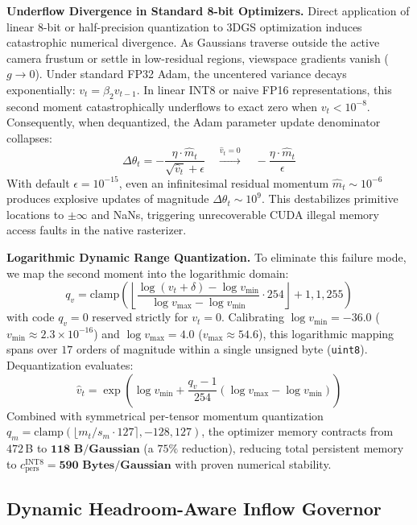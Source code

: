 \documentclass[10pt,twocolumn,letterpaper]{article}
\begin{document}
\textbf{Underflow Divergence in Standard 8-bit Optimizers.} Direct application of linear 8-bit or half-precision quantization to 3DGS optimization induces catastrophic numerical divergence. As Gaussians traverse outside the active camera frustum or settle in low-residual regions, viewspace gradients vanish ($g \to 0$). Under standard FP32 Adam, the uncentered variance decays exponentially: $v_t = \beta_2 v_{t-1}$. In linear INT8 or naive FP16 representations, this second moment catastrophically underflows to exact zero when $v_t < 10^{-8}$. Consequently, when dequantized, the Adam parameter update denominator collapses:
\begin{equation}
\Delta \theta_t = -\frac{\eta \cdot \hat{m}_t}{\sqrt{\hat{v}_t} + \epsilon} \quad \xrightarrow{\hat{v}_t = 0} \quad -\frac{\eta \cdot \hat{m}_t}{\epsilon}
\end{equation}
With default $\epsilon = 10^{-15}$, even an infinitesimal residual momentum $\hat{m}_t \sim 10^{-6}$ produces explosive updates of magnitude $\Delta \theta_t \sim 10^9$. This destabilizes primitive locations to $\pm \infty$ and NaNs, triggering unrecoverable CUDA illegal memory access faults in the native rasterizer.

\textbf{Logarithmic Dynamic Range Quantization.} To eliminate this failure mode, we map the second moment into the logarithmic domain:
\begin{equation}
q_v = \text{clamp}\left(\left\lfloor \frac{\log(v_t + \delta) - \log v_{\min}}{\log v_{\max} - \log v_{\min}} \cdot 254 \right\rfloor + 1, 1, 255\right)
\end{equation}
with code $q_v = 0$ reserved strictly for $v_t = 0$. Calibrating $\log v_{\min} = -36.0$ ($v_{\min} \approx 2.3 \times 10^{-16}$) and $\log v_{\max} = 4.0$ ($v_{\max} \approx 54.6$), this logarithmic mapping spans over $17$ orders of magnitude within a single unsigned byte (\texttt{uint8}). Dequantization evaluates:
\begin{equation}
\hat{v}_t = \exp\left(\log v_{\min} + \frac{q_v - 1}{254} (\log v_{\max} - \log v_{\min})\right)
\end{equation}
Combined with symmetrical per-tensor momentum quantization $q_m = \text{clamp}(\lfloor m_t / s_m \cdot 127 \rceil, -128, 127)$, the optimizer memory contracts from $472$\,B to $\mathbf{118\text{ B/Gaussian}}$ (a $75\%$ reduction), reducing total persistent memory to $c_{\text{pers}}^{\text{INT8}} = \mathbf{590\text{ Bytes/Gaussian}}$ with proven numerical stability.

\subsection{Dynamic Headroom-Aware Inflow Governor}
\end{document}
